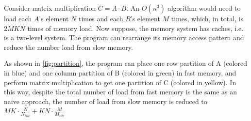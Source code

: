 \documentclass{article}
\begin{document}
Consider matrix multiplication $C = A\cdot B$.
An $O(n^3)$ algorithm would need to load each $A$'s element $N$ times 
and each $B$'s element $M$ times, which, in total, is $2MKN$ times of memory load.
Now suppose, the memory system has caches, i.e. is a two-level system.
The program can rearrange its memory access pattern and reduce the number load from slow memory.

As shown in \ref{fig:partition}, 
the program can place one row partition of A (colored in blue) and 
one column partition of B (colored in green) in fast memory, 
and perform matrix multiplication to get one partition of C (colored in yellow).
In this way, despite the total number of load from fast memory is the same as an naive approach,
the number of load from slow memory is reduced to $MK\cdot \frac{N}{N_{tile}} + KN\cdot\frac{M}{M_{tile}}$
\end{document}
